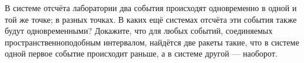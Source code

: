 \documentclass[a4paper,12pt]{article}
\newcommand{\мв}{\,м$_в$\xspace}
\begin{document}
В системе отсчёта лаборатории два события происходят одновременно
в одной и той же точке;
в разных точках.
В каких ещё системах отсчёта эти события также будут одновременными?
Докажите, что для любых событий, соединяемых пространственноподобным интервалом, найдётся две ракеты такие, что в системе одной первое событие происходит раньше, а в системе другой --- наоборот.





\end{document}
